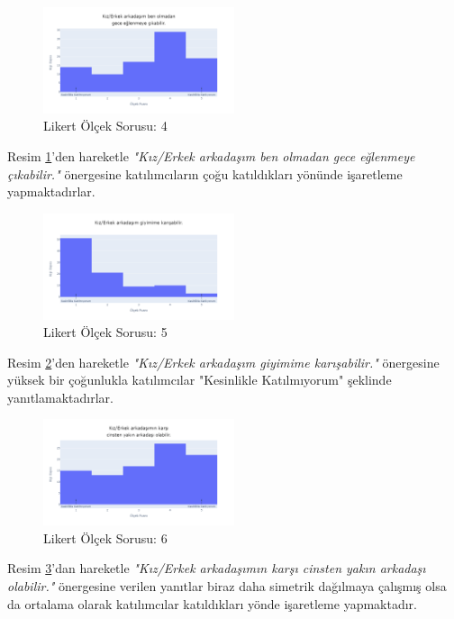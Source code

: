 \documentclass{article}
\begin{document}
\begin{twocolumn}
\clearpage
    \begin{figure}[htbp]
        \centering
        \includegraphics[width=0.5\textwidth]{Imgs/likert4.png}
        \caption{Likert Ölçek Sorusu: 4}
        \label{likert4}
    \end{figure}
Resim \ref{likert4}'den hareketle \textit{"Kız/Erkek arkadaşım ben olmadan gece eğlenmeye çıkabilir."} önergesine katılımcıların çoğu katıldıkları yönünde işaretleme yapmaktadırlar.

    \begin{figure}[htbp]
        \centering
        \includegraphics[width=0.5\textwidth]{Imgs/likert5.png}
        \caption{Likert Ölçek Sorusu: 5}
        \label{likert5}
    \end{figure}
Resim \ref{likert5}'den hareketle \textit{"Kız/Erkek arkadaşım giyimime karışabilir."} önergesine yüksek bir çoğunlukla katılımcılar "Kesinlikle Katılmıyorum" şeklinde yanıtlamaktadırlar.

    \begin{figure}[htbp]
        \centering
        \includegraphics[width=0.5\textwidth]{Imgs/likert6.png}
        \caption{Likert Ölçek Sorusu: 6}
        \label{likert6}
    \end{figure}
Resim \ref{likert6}'dan hareketle \textit{"Kız/Erkek arkadaşımın karşı cinsten yakın arkadaşı olabilir."} önergesine verilen yanıtlar biraz daha simetrik dağılmaya çalışmış olsa da ortalama olarak katılımcılar katıldıkları yönde işaretleme yapmaktadır.


\end{twocolumn}
\end{document}
